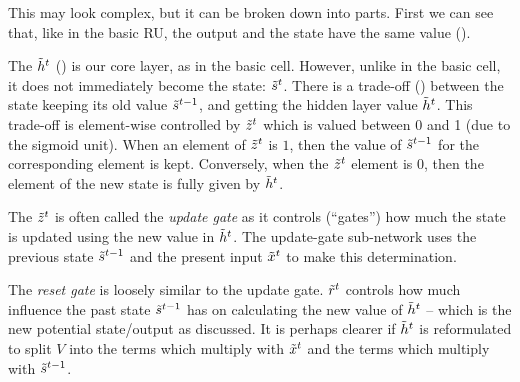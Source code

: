 \documentclass[12pt,parskip]{komatufte}
\begin{document}

This may look complex, but it can be broken down into parts.
First we can see that, like in the basic RU, the output and the state have the same value ().

The $\nv h_t$  () is our core layer, as in the basic cell.
However, unlike in the basic cell, it does not immediately become the state: $\nv s_t$.
There is a trade-off () between the state keeping its old value $\nv s_{t-1}$, and getting the hidden layer value $\nv h_t$.
This trade-off is element-wise controlled by $\nv z_t$ which is valued between 0 and 1 (due to the sigmoid unit).
When an element of $\nv z_t$ is $1$, then the value of $\nv s_{t-1}$ for the corresponding element is kept.
Conversely, when the $\nv z_t$ element is $0$,  then the element of the new state is fully given by $\nv h_t$.

The $\nv z_t$ is often called the \emph{update gate} as it controls (``gates'') how much the state is updated using the new value in $\nv h_t$.
The update-gate sub-network uses the previous state $\nv s_{t-1}$ and the present input $\nv x_t$ to make this determination.


The \emph{reset gate} is loosely similar to the update gate.
$\nv r_t$ controls how much influence the past state $\nv s_{t-1}$ has on calculating the new value of $\nv h_t$ -- which is the new potential state/output as discussed.
It is perhaps clearer if $\nv h_t$ is reformulated to split $V$ into the terms which multiply with $\nv x_t$ and the terms which multiply with $\nv s_{t-1}$.
\end{document}
